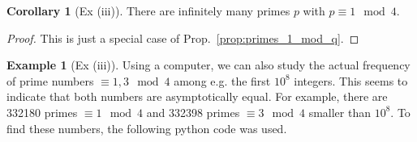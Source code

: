 \documentclass{scrartcl}
\theoremstyle{definition}
\newtheorem{example}[definition]{Example}
\newtheorem{corollary}[definition]{Corollary}
\begin{document}
\begin{corollary}[Ex (iii)]
    There are infinitely many primes $p$ with $p \equiv 1 \mod 4$.
\end{corollary}
\begin{proof}
    This is just a special case of Prop.~\ref{prop:primes_1_mod_q}.
\end{proof}
\begin{example}[Ex (iii)]
    Using a computer, we can also study the actual frequency of prime numbers $\equiv 1, 3 \mod 4$ among e.g. the first $10^8$ integers.
    This seems to indicate that both numbers are asymptotically equal.
    For example, there are 332180 primes $\equiv 1 \mod 4$ and 332398 primes $\equiv 3 \mod 4$ smaller than $10^8$.
    To find these numbers, the following python code was used.
    
\end{example}
\end{document}

